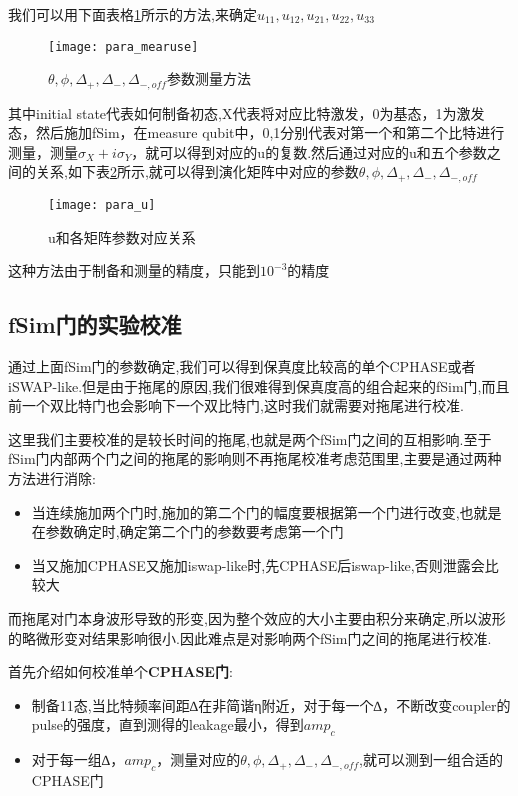 我们可以用下面表格\ref{para_mearuse}所示的方法,来确定$u_{11},u_{12},u_{21},u_{22},u_{33}$
\begin{figure}
	\centering
	\texttt{[image: para\_mearuse]}
	\caption{$\theta,\phi,\Delta_{+},\Delta_{-},\Delta_{-,off}$参数测量方法} 
	\label{para_mearuse}
\end{figure}
其中initial state代表如何制备初态,X代表将对应比特激发，0为基态，1为激发态，然后施加fSim，在measure qubit中，0,1分别代表对第一个和第二个比特进行测量，测量$σ_{X}+iσ_{Y}$，就可以得到对应的u的复数.然后通过对应的u和五个参数之间的关系,如下表\ref{para_u}所示,就可以得到演化矩阵中对应的参数$\theta,\phi,\Delta_{+},\Delta_{-},\Delta_{-,off}$
\begin{figure}
	\centering
	\texttt{[image: para\_u]}
	\caption{u和各矩阵参数对应关系} 
	\label{para_u}
\end{figure}

这种方法由于制备和测量的精度，只能到$10^{-3}$的精度
\subsection{fSim门的实验校准}
通过上面fSim门的参数确定,我们可以得到保真度比较高的单个CPHASE或者iSWAP-like.但是由于拖尾的原因,我们很难得到保真度高的组合起来的fSim门,而且前一个双比特门也会影响下一个双比特门,这时我们就需要对拖尾进行校准.

这里我们主要校准的是较长时间的拖尾,也就是两个fSim门之间的互相影响.至于fSim门内部两个门之间的拖尾的影响则不再拖尾校准考虑范围里,主要是通过两种方法进行消除:
\begin{itemize}
	\item 当连续施加两个门时,施加的第二个门的幅度要根据第一个门进行改变,也就是在参数确定时,确定第二个门的参数要考虑第一个门
	\item 当又施加CPHASE又施加iswap-like时,先CPHASE后iswap-like,否则泄露会比较大
\end{itemize}
而拖尾对门本身波形导致的形变,因为整个效应的大小主要由积分来确定,所以波形的略微形变对结果影响很小.因此难点是对影响两个fSim门之间的拖尾进行校准.

首先介绍如何校准单个\textbf{CPHASE门}:
\begin{itemize}
	\item[1] 制备11态,当比特频率间距∆在非简谐η附近，对于每一个∆，不断改变coupler的pulse的强度，直到测得的leakage最小，得到$amp_{c}$
	\item[2] 对于每一组∆，$amp_{c}$，测量对应的$\theta,\phi,\Delta_{+},\Delta_{-},\Delta_{-,off}$,就可以测到一组合适的CPHASE门
\end{itemize}

